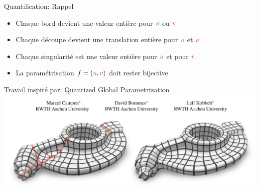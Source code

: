 \begin{frame}{Quantification: Rappel}
\begin{tikzpicture}[scale=1.38]
	\end{tikzpicture}
    \begin{itemize}
        \item Chaque bord devient une valeur entière pour $\blue{u}$ ou $\red{v}$
        \item Chaque découpe devient une translation entière pour $\blue{u}$ et $\red{v}$
        \item Chaque singularité est une valeur entière pour $\blue{u}$ et pour $\red{v}$
		\item La paramétrisation $f = (\blue{u}, \red{v})$ doit rester bijective
    \end{itemize}
\end{frame}

\begin{frame}{Travail inspiré par: Quantized Global Parametrization}
    \centering
    \includegraphics[width=\linewidth]{yoimg/qgp.png}
\end{frame}

